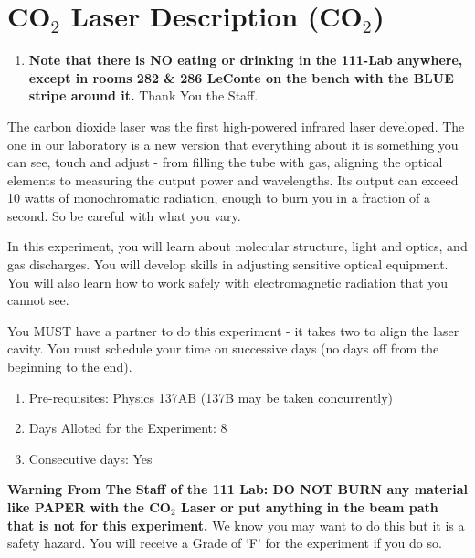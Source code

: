 \documentclass{../lab}
\begin{document}
\maketitle

\tableofcontents

\section{CO\texorpdfstring{$_2$}{2} Laser Description (CO\texorpdfstring{$_2$}{2})}

\begin{enumerate}
    \item \textbf{Note that there is NO eating or drinking in the 111-Lab anywhere, except in rooms 282 \& 286 LeConte on the bench with the BLUE stripe around it.} Thank You the Staff.

\end{enumerate}

The carbon dioxide laser was the first high-powered infrared laser developed. The one in our laboratory is a new version that everything about it is something you can see, touch and adjust - from filling the tube with gas, aligning the optical elements to measuring the output power and wavelengths. Its output can exceed 10 watts of monochromatic radiation, enough to burn you in a fraction of a second. So be careful with what you vary.

In this experiment, you will learn about molecular structure, light and optics, and gas discharges. You will develop skills in adjusting sensitive optical equipment. You will also learn how to work safely with electromagnetic radiation that you cannot see.

You MUST have a partner to do this experiment - it takes two to align the laser cavity. You must schedule your time on successive days (no days off from the beginning to the end).

\begin{enumerate}
    \item Pre-requisites: Physics 137AB (137B may be taken concurrently)

    \item Days Alloted for the Experiment: 8

    \item Consecutive days: Yes

\end{enumerate}

\textbf{Warning From The Staff of the 111 Lab: DO NOT BURN any material like PAPER with the CO$_2$ Laser or put anything in the beam path that is not for this experiment.} We know you may want to do this but it is a safety hazard. You will receive a Grade of `F' for the experiment if you do so.
\end{document}
